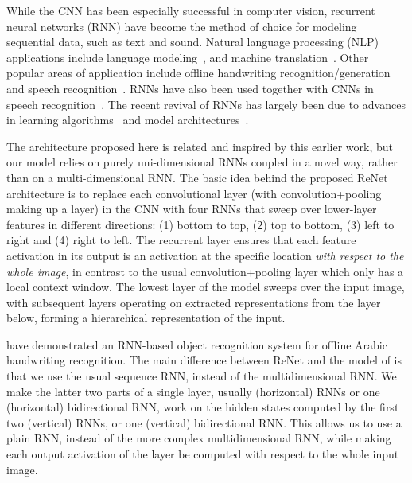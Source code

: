 While the CNN has been especially successful in computer vision, recurrent
neural networks (RNN) have become the method of choice for modeling sequential
data, such as text and sound. Natural language processing (NLP) applications
include language modeling~\citep[see, e.g.,][]{Mikolov-thesis-2012}, and machine
translation~\citep{Sutskever-et-al-NIPS2014,Cho2014,bahdanau2014neural}.  Other
popular areas of application include offline handwriting
recognition/generation~\citep{Graves+Schmidhuber-2009,Graves-et-al-NIPS2007,Graves-arxiv2013}
and speech recognition~\citep{Chorowski-et-al-arxiv2014,Graves+Jaitly-ICML2014}.
RNNs have also been used together with CNNs in speech
recognition~\citep{sainath2015}.  The recent revival of RNNs has largely been
due to advances in learning
algorithms~\citep{Pascanu+al-ICML2013-small,Martens+Sutskever-ICML2011} and
model
architectures~\citep{Pascanu-et-al-ICLR2014,Hochreiter+Schmidhuber-1997,Cho2014}.


The architecture proposed here is
related and inspired by this earlier work, but our model relies on purely
uni-dimensional RNNs coupled in a novel way, rather than on a multi-dimensional
RNN. The basic idea behind the proposed ReNet architecture is to replace each
convolutional layer (with convolution+pooling making up a layer) in the CNN with
four RNNs that sweep over lower-layer features in different directions: (1)
bottom to top, (2) top to bottom, (3) left to right and (4) right to left.
The recurrent layer ensures that each feature activation in its output is an
activation at the specific location \emph{with respect to the whole image}, in
contrast to the usual convolution+pooling layer which only has a local context
window.  The lowest layer of the model sweeps over the input image, with
subsequent layers operating on extracted representations from the layer below,
forming a hierarchical representation of the input.

\citet{Graves+Schmidhuber-2009} have demonstrated an RNN-based object
recognition system for offline Arabic handwriting recognition.  The main
difference between ReNet and the model of \citet{Graves+Schmidhuber-2009} is
that we use the usual sequence RNN, instead of the multidimensional RNN. We make
the latter two parts of a single layer, usually (horizontal) RNNs or one
(horizontal) bidirectional RNN, work on the hidden states computed by the first
two (vertical) RNNs, or one (vertical) bidirectional RNN. This allows us to use
a plain RNN, instead of the more complex multidimensional RNN, while making each
output activation of the layer be computed with respect to the whole input
image.

